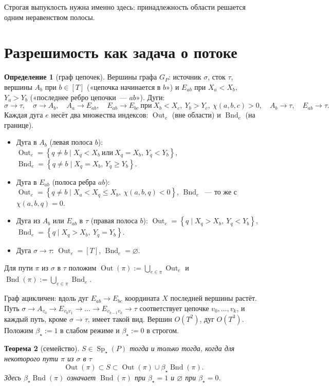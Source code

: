 \documentclass[a4paper,11pt]{article}
\theoremstyle{plain}
\newtheorem{theorem}{Теорема}[section]
\theoremstyle{definition}
\newtheorem{definition}[theorem]{Определение}
\theoremstyle{remark}
\newcommand{\set}[1]{\left\{ #1 \right\}}
\DeclareMathOperator{\Sp}{Sp}
\DeclareMathOperator{\Out}{Out}
\DeclareMathOperator{\Bnd}{Bnd}
\newcommand{\Spm}{\Sp_\star}
\begin{document}
Строгая выпуклость нужна именно здесь: принадлежность области решается одним неравенством полосы.

\section{Разрешимость как задача о потоке}\label{sec:lp}

\begin{definition}[граф цепочек]\label{def:graph}
    Вершины графа $G_P$: источник $\sigma$, сток $\tau$, вершины $A_b$ при $b\in[T]$ («цепочка начинается в $b$») и $E_{ab}$ при $X_a<X_b$, $Y_a>Y_b$ («последнее ребро цепочки~--- $ab$»). Дуги:
    \[
        \sigma\to\tau,\quad \sigma\to A_b,\quad A_a\to E_{ab},\quad E_{ab}\to E_{bc}\ \text{при}\ X_b<X_c,\ Y_b>Y_c,\ \chi(a,b,c)>0,\quad A_b\to\tau,\quad E_{ab}\to\tau.
    \]
    Каждая дуга $e$ несёт два множества индексов: $\Out_e$ (вне области) и $\Bnd_e$ (на границе).
    \begin{itemize}
        \item Дуга в $A_b$ (левая полоса $b$): $\Out_e=\set{q\ne b\mid X_q<X_b\ \text{или}\ X_q=X_b,\,Y_q<Y_b}$, $\Bnd_e=\set{q\ne b\mid X_q=X_b,\,Y_q\ge Y_b}$.
        \item Дуга в $E_{ab}$ (полоса ребра $ab$): $\Out_e=\set{q\ne b\mid X_a<X_q\le X_b,\ \chi(a,b,q)<0}$, $\Bnd_e$~--- то же с $\chi(a,b,q)=0$.
        \item Дуга из $A_b$ или $E_{ab}$ в $\tau$ (правая полоса $b$): $\Out_e=\set{q\mid X_q>X_b,\ Y_q<Y_b}$, $\Bnd_e=\set{q\mid X_q>X_b,\ Y_q=Y_b}$.
        \item Дуга $\sigma\to\tau$: $\Out_e=[T]$, $\Bnd_e=\varnothing$.
    \end{itemize}
    Для пути $\pi$ из $\sigma$ в $\tau$ положим $\Out(\pi):=\bigcup_{e\in\pi}\Out_e$ и $\Bnd(\pi):=\bigcup_{e\in\pi}\Bnd_e$.
\end{definition}

Граф ацикличен: вдоль дуг $E_{ab}\to E_{bc}$ координата $X$ последней вершины растёт. Путь $\sigma\to A_{v_0}\to E_{v_0v_1}\to\dots\to E_{v_{k-1}v_k}\to\tau$ соответствует цепочке $v_0,\dots,v_k$, и каждый путь, кроме $\sigma\to\tau$, имеет такой вид. Вершин $O(T^2)$, дуг $O(T^3)$. Положим $\beta_\star:=1$ в слабом режиме и $\beta_\star:=0$ в строгом.

\begin{theorem}[семейство]\label{thm:family}
    $S\in\Spm(P)$ тогда и только тогда, когда для некоторого пути $\pi$ из $\sigma$ в $\tau$
    \[
        \Out(\pi)\subset S\subset\Out(\pi)\cup\beta_\star\Bnd(\pi).
    \]
    Здесь $\beta_\star\Bnd(\pi)$ означает $\Bnd(\pi)$ при $\beta_\star=1$ и $\varnothing$ при $\beta_\star=0$.
\end{theorem}
\end{document}
